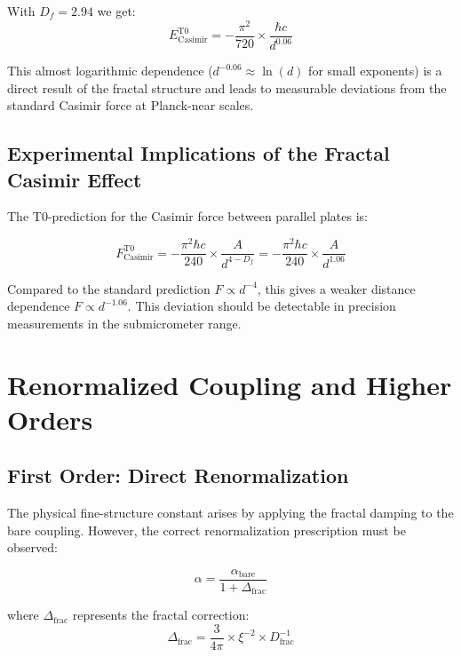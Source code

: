 \documentclass[12pt,a4paper]{article}
\theoremstyle{definition}
\begin{document}
	With $D_f = 2.94$ we get:
	\begin{equation}
		E_{\text{Casimir}}^{\text{T0}} = -\frac{\pi^2}{720} \times \frac{\hbar c}{d^{0.06}}
	\end{equation}
	
	This almost logarithmic dependence ($d^{-0.06} \approx \ln(d)$ for small exponents) is a direct result of the fractal structure and leads to measurable deviations from the standard Casimir force at Planck-near scales.
	
	\subsection{Experimental Implications of the Fractal Casimir Effect}
	
	The T0-prediction for the Casimir force between parallel plates is:
	
	\begin{equation}
		F_{\text{Casimir}}^{\text{T0}} = -\frac{\pi^2 \hbar c}{240} \times \frac{A}{d^{4-D_f}} = -\frac{\pi^2 \hbar c}{240} \times \frac{A}{d^{1.06}}
	\end{equation}
	
	Compared to the standard prediction $F \propto d^{-4}$, this gives a weaker distance dependence $F \propto d^{-1.06}$. This deviation should be detectable in precision measurements in the submicrometer range.
	
	\section{Renormalized Coupling and Higher Orders}
	
	\subsection{First Order: Direct Renormalization}
	
	The physical fine-structure constant arises by applying the fractal damping to the bare coupling. However, the correct renormalization prescription must be observed:
	
	\begin{equation}
		\alpha = \frac{\alpha_{\text{bare}}}{1 + \Delta_{\text{frac}}}
	\end{equation}
	
	where $\Delta_{\text{frac}}$ represents the fractal correction:
	\begin{equation}
		\Delta_{\text{frac}} = \frac{3}{4\pi} \times \xi^{-2} \times D_{\text{frac}}^{-1}
	\end{equation}
	
\end{document}
